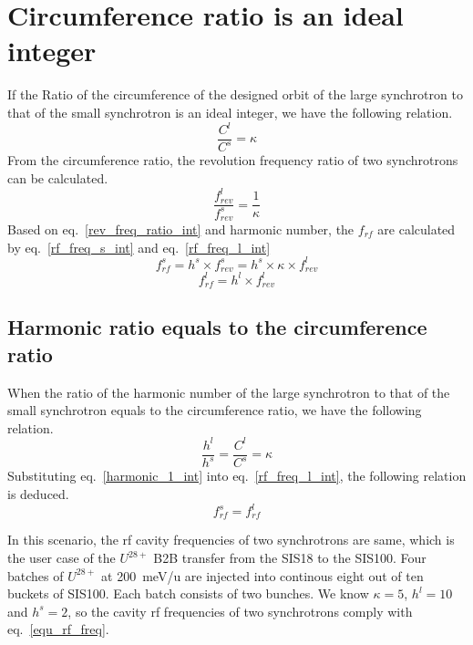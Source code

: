 \section{ Circumference ratio is an ideal integer}
If the Ratio of the circumference of the designed orbit of the large synchrotron to that of the small synchrotron is an ideal integer, we have the following relation. 
\begin{equation}
\frac{C^l}{C^s}=\kappa \label{circumference_ratio_int}
\end{equation}
From the circumference ratio, the revolution frequency ratio of two synchrotrons can be calculated.
\begin{equation}
\frac{f_{rev}^{l}}{f_{rev}^{s}}=\frac{1}{\kappa} \label{rev_freq_ratio_int}
\end{equation}
Based on eq.~\ref{rev_freq_ratio_int} and harmonic number, the $f_{rf}$ are calculated by eq.~\ref{rf_freq_s_int} and eq.~\ref{rf_freq_l_int}
\begin{equation} 
f_{rf}^{s}= h^s \times f_{rev}^{s}=h^s \times \kappa \times f_{rev}^{l} \label{rf_freq_s_int}
\end{equation}
\begin{equation} 
f_{rf}^{l}= h^l \times f_{rev}^{l} \label{rf_freq_l_int}
\end{equation}
\subsection{Harmonic ratio equals to the circumference ratio}
When the ratio of the harmonic number of the large synchrotron to that of the small synchrotron equals to the circumference ratio, we have the following relation.
\begin{equation}
\frac {h^{l}}{h^{s}}=\frac {C^{l}}{C^{s}}= \kappa  \label{harmonic_1_int}
\end{equation}
Substituting eq.~\ref{harmonic_1_int} into eq.~\ref{rf_freq_l_int}, the following relation is deduced. 
\begin{equation}
f_{rf}^{s}= f_{rf}^{l}\label{equ_rf_freq}
\end{equation}

In this scenario, the rf cavity frequencies of two synchrotrons are same, which is the user case of the $U^{28+}$ B2B transfer from the SIS18 to the SIS100. Four batches of $U^{28+}$ at \SI{200}{meV/\atomicmassunit} are injected into continous eight out of ten buckets of SIS100. Each batch consists of two bunches. We know $\kappa=5$, $h^l=10$ and $h^s=2$, so the cavity rf frequencies of two synchrotrons comply with eq.~\ref{equ_rf_freq}.

